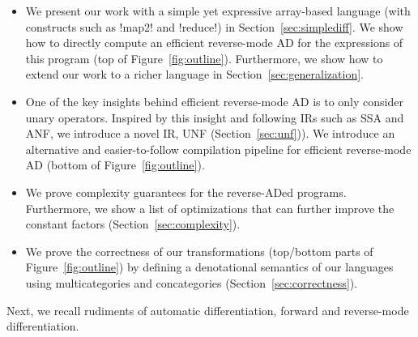 \begin{itemize}[leftmargin=*]
\item We present our work with a simple yet expressive array-based language (with constructs such as !map2! and !reduce!) in Section~\ref{sec:simplediff}. 
We show how to directly compute an efficient reverse-mode AD for the expressions of this program (top of Figure~\ref{fig:outline}).  
Furthermore, we show how to extend our work to a richer language in Section~\ref{sec:generalization}.
\item One of the key insights behind efficient reverse-mode AD is to only consider unary operators. 
Inspired by this insight and following IRs such as SSA and ANF, we introduce a novel IR, UNF (Section~\ref{sec:unf})).
We introduce an alternative and easier-to-follow compilation pipeline for efficient reverse-mode AD (bottom of Figure~\ref{fig:outline}).
\item We prove complexity guarantees for the reverse-ADed programs. Furthermore, we show a list of optimizations that can further improve the constant factors (Section~\ref{sec:complexity}).
\item We prove the correctness of our transformations (top/bottom parts of Figure~\ref{fig:outline}) by defining a denotational semantics of our languages using multicategories and concategories (Section~\ref{sec:correctness}).
\end{itemize}

Next, we recall rudiments of automatic differentiation, forward and reverse-mode differentiation.




